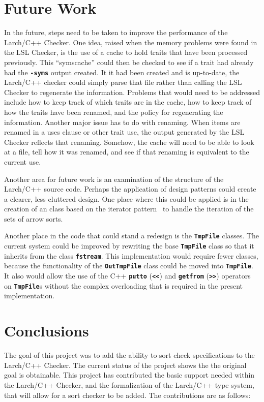 \documentclass[12pt]{article} %
\newcommand{\reserved}[1]{\textbf{\texttt{#1}}} %
\begin{document}


\section{Future Work}
\label{futwork}
In the future, steps need to be taken to improve the performance of
the Larch/C++ Checker. One idea, raised when the memory problems were
found in the LSL Checker, is the use of a cache to hold traits that
have been processed previously. This ``symscache'' could then be
checked to see if a trait had already had the \reserved{-syms} output
created. It it had been created and is up-to-date, the Larch/C++
checker could simply parse that file rather than calling the LSL
Checker to regenerate the information. Problems that would need to be
addressed include how to keep track of which traits are in the cache,
how to keep track of how the traits have been renamed, and the policy
for regenerating the information. Another major issue has to do with
renaming. When items are renamed in a uses clause or other trait use,
the output generated by the LSL Checker reflects that
renaming. Somehow, the cache will need to be able to look at a file,
tell how it was renamed, and see if that renaming is equivalent to the
current use.

Another area for future work is an examination of the structure of the
Larch/C++ source code. Perhaps the application of design patterns
could create a clearer, less cluttered design. One place where this
could be applied is in the creation of an class based on the
iterator pattern~\cite{Gamma-Helm-Johnson-Vlissides95} to
handle the iteration of the sets of arrow sorts.

Another place in the code that could stand a redesign is the
\reserved{TmpFile} classes. The current system could be improved by
rewriting the base \reserved{TmpFile} class so that it inherits from
the class \reserved{fstream}. This implementation would require fewer
classes, because the functionality of the \reserved{OutTmpFile} class
could be moved into \reserved{TmpFile}. It also would allow the use of
the C++ \reserved{putto} (\reserved{<<}) and \reserved{getfrom}
(\reserved{>>}) operators on \reserved{TmpFile}s without the complex
overloading that is required in the present implementation.

\section{Conclusions}
The goal of this project was to add the ability to sort check
specifications to the Larch/C++ Checker. The current status of the
project shows the the original goal is obtainable. This project has
contributed the basic support needed within the Larch/C++ Checker, and
the formalization of the Larch/C++ type system, that will allow for a
sort checker to be added. The contributions are as follows:
\end{document}
